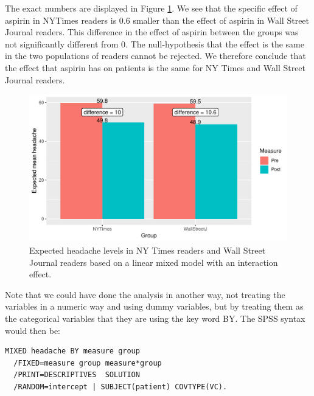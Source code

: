 \documentclass[]{book}\usepackage[]{graphicx}\usepackage[]{color}
\makeatletter
\def\maxwidth{ %
  \ifdim\Gin@nat@width>\linewidth
    \linewidth
  \else
    \Gin@nat@width
  \fi
}
\newenvironment{knitrout}{}{} %
\makeatother
\begin{document}
The exact numbers are displayed in Figure \ref{fig:analysisprepostmixed3}. We see that the specific effect of aspirin in NYTimes readers is 0.6 smaller than the effect of aspirin in Wall Street Journal readers. This difference in the effect of aspirin between the groups was not significantly different from 0. The null-hypothesis that the effect is the same in the two populations of readers cannot be rejected. We therefore conclude that the effect that aspirin has on patients is the same for NY Times and Wall Street Journal readers.

\begin{knitrout}
\color{fgcolor}\begin{figure}

{\centering \includegraphics[width=\maxwidth]{figure/analysisprepostmixed3-1} 

}

\caption[Expected headache levels in NY Times readers and Wall Street Journal readers based on a linear mixed model with an interaction effect]{Expected headache levels in NY Times readers and Wall Street Journal readers based on a linear mixed model with an interaction effect.}\label{fig:analysisprepostmixed3}
\end{figure}


\end{knitrout}



Note that we could have done the analysis in another way, not treating the variables in a numeric way and using dummy variables, but by treating them as the categorical variables that they are using the key word BY. The SPSS syntax would then be:

\begin{verbatim}
MIXED headache BY measure group 
  /FIXED=measure group measure*group
  /PRINT=DESCRIPTIVES  SOLUTION
  /RANDOM=intercept | SUBJECT(patient) COVTYPE(VC).
\end{verbatim}
\end{document}
